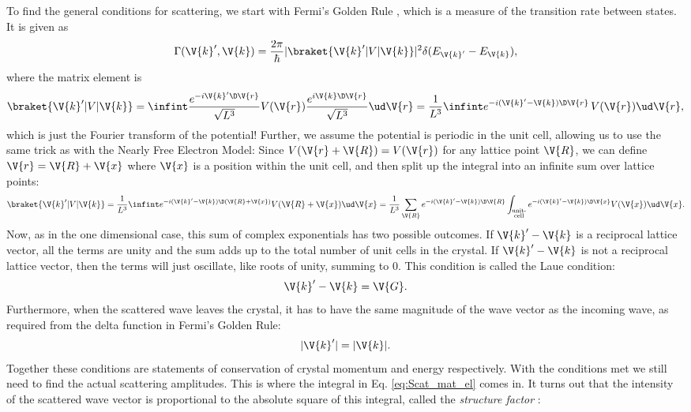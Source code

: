 \documentclass[main.tex]{subfiles}
\begin{document}
	To find the general conditions for scattering, we start with Fermi's Golden Rule \cite{simon}, which is a measure of the transition rate between states. It is given as
	\begin{equation}\label{eq:Scat_fermi}
		\Gamma(\V{k}', \V{k}) = \frac{2\pi}{\hbar}|\braket{\V{k}' | V | \V{k}}|^2 \delta(E_{\V{k}'}-E_{\V{k}}),
	\end{equation}
	where the matrix element is
	\begin{equation}\label{eq:Scat_mat_el_initial}
		\braket{\V{k}' | V | \V{k}} = \infint \frac{e^{-i \V{k}'\D\V{r}}}{\sqrt{L^3}} V(\V{r}) \frac{e^{i \V{k}\D\V{r}}}{\sqrt{L^3}} \ud \V{r} = \frac{1}{L^3} \infint e^{-i(\V{k}'-\V{k}) \D \V{r}} \, V(\V{r}) \ud \V{r},
	\end{equation}
	which is just the Fourier transform of the potential! Further, we assume the potential is periodic in the unit cell, allowing us to use the same trick as with the Nearly Free Electron Model: Since $ V(\V{r} + \V{R}) =  V(\V{r}) $ for any lattice point $ \V{R} $, we can define $ \V{r} = \V{R} + \V{x} $ where $ \V{x} $ is a position within the unit cell, and then split up the integral into an infinite sum over lattice points:
	\begin{equation}\label{eq:Scat_mat_el}
		\braket{\V{k}' | V | \V{k}} = \frac{1}{L^3}\infint e^{-i(\V{k}'-\V{k})\D(\V{R}+\V{x})} V(\V{R}+ \V{x}) \ud \V{x} = \frac{1}{L^3} \sum_{\V{R}} e^{-i(\V{k}'-\V{k}) \D \V{R}}\int_{\substack{\text{unit-} \\\text{cell}}} e^{-i (\V{k}'-\V{k}) \D \V{x}} V(\V{x}) \ud \V{x}.
	\end{equation}
	Now, as in the one dimensional case, this sum of complex exponentials has two possible outcomes. If $ \V{k}'-\V{k} $ is a reciprocal lattice vector, all the terms are unity and the sum adds up to the total number of unit cells in the crystal. If $ \V{k}'-\V{k} $ is not a reciprocal lattice vector, then the terms will just oscillate, like roots of unity, summing to 0. This condition is called the Laue condition:
	\begin{equation}\label{eq:Scat_Laue}
		\V{k}' - \V{k} =  \V{G}.
	\end{equation}
	Furthermore, when the scattered wave leaves the crystal, it has to have the same magnitude of the wave vector as the incoming wave, as required from the delta function in Fermi's Golden Rule:
	\begin{equation}\label{eq:Scat_E_cons}
		|\V{k}'| = |\V{k}|.
	\end{equation}
	Together these conditions are statements of conservation of crystal momentum and energy respectively. With the conditions met we still need to find the actual scattering amplitudes. This is where the integral in Eq. \eqref{eq:Scat_mat_el} comes in. It turns out that the intensity of the scattered wave vector is proportional to the absolute square of this integral, called the \textit{structure factor} \cite{simon}:
\end{document}
